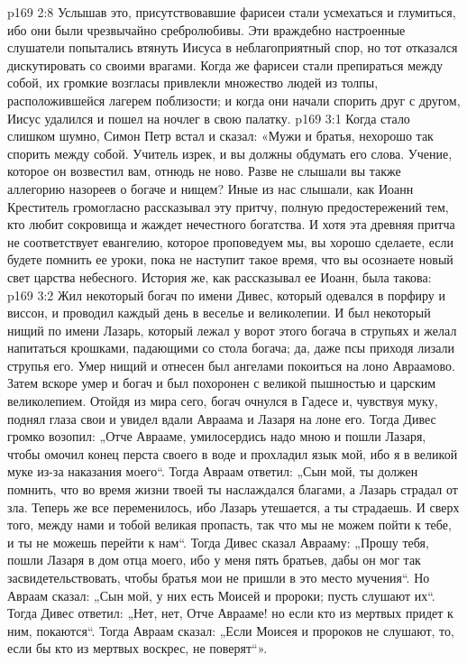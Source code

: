 \vs p169 2:8 \pc Услышав это, присутствовавшие фарисеи стали усмехаться и глумиться, ибо они были чрезвычайно сребролюбивы. Эти враждебно настроенные слушатели попытались втянуть Иисуса в неблагоприятный спор, но тот отказался дискутировать со своими врагами. Когда же фарисеи стали препираться между собой, их громкие возгласы привлекли множество людей из толпы, расположившейся лагерем поблизости; и когда они начали спорить друг с другом, Иисус удалился и пошел на ночлег в свою палатку.
\vs p169 3:1 Когда стало слишком шумно, Симон Петр встал и сказал: «Мужи и братья, нехорошо так спорить между собой. Учитель изрек, и вы должны обдумать его слова. Учение, которое он возвестил вам, отнюдь не ново. Разве не слышали вы также аллегорию назореев о богаче и нищем? Иные из нас слышали, как Иоанн Креститель громогласно рассказывал эту притчу, полную предостережений тем, кто любит сокровища и жаждет нечестного богатства. И хотя эта древняя притча не соответствует евангелию, которое проповедуем мы, вы хорошо сделаете, если будете помнить ее уроки, пока не наступит такое время, что вы осознаете новый свет царства небесного. История же, как рассказывал ее Иоанн, была такова:
\vs p169 3:2 Жил некоторый богач по имени Дивес, который одевался в порфиру и виссон, и проводил каждый день в веселье и великолепии. И был некоторый нищий по имени Лазарь, который лежал у ворот этого богача в струпьях и желал напитаться крошками, падающими со стола богача; да, даже псы приходя лизали струпья его. Умер нищий и отнесен был ангелами покоиться на лоно Авраамово. Затем вскоре умер и богач и был похоронен с великой пышностью и царским великолепием. Отойдя из мира сего, богач очнулся в Гадесе и, чувствуя муку, поднял глаза свои и увидел вдали Авраама и Лазаря на лоне его. Тогда Дивес громко возопил: „Отче Аврааме, умилосердись надо мною и пошли Лазаря, чтобы омочил конец перста своего в воде и прохладил язык мой, ибо я в великой муке из\hyp{}за наказания моего“. Тогда Авраам ответил: „Сын мой, ты должен помнить, что во время жизни твоей ты наслаждался благами, а Лазарь страдал от зла. Теперь же все переменилось, ибо Лазарь утешается, а ты страдаешь. И сверх того, между нами и тобой великая пропасть, так что мы не можем пойти к тебе, и ты не можешь перейти к нам“. Тогда Дивес сказал Аврааму: „Прошу тебя, пошли Лазаря в дом отца моего, ибо у меня пять братьев, дабы он мог так засвидетельствовать, чтобы братья мои не пришли в это место мучения“. Но Авраам сказал: „Сын мой, у них есть Моисей и пророки; пусть слушают их“. Тогда Дивес ответил: „Нет, нет, Отче Аврааме! но если кто из мертвых придет к ним, покаются“. Тогда Авраам сказал: „Если Моисея и пророков не слушают, то, если бы кто из мертвых воскрес, не поверят“».
